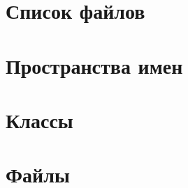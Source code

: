 \documentclass[twoside]{book}
\newcommand{\+}{\discretionary{\mbox{\scriptsize$\hookleftarrow$}}{}{}}
\begin{document}
\chapter{Список файлов}

\chapter{Пространства имен}

\chapter{Классы}











\chapter{Файлы}


















\newpage
{}
{}
\printindex
\end{document}
